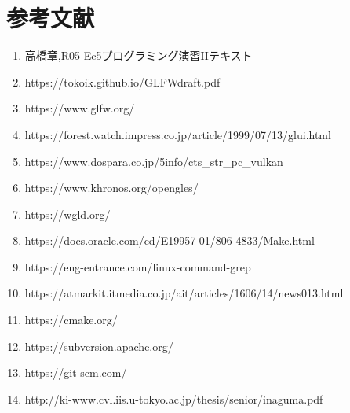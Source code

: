 \documentclass[]{jarticle}
\begin{document}
\section*{参考文献}
\begin{enumerate}
  \item 高橋章,R05-Ec5プログラミング演習I\hspace{-1.2pt}Iテキスト
  \item https://tokoik.github.io/GLFWdraft.pdf
  \item https://www.glfw.org/
  \item https://forest.watch.impress.co.jp/article/1999/07/13/glui.html
  \item https://www.dospara.co.jp/5info/cts\_str\_pc\_vulkan
  \item https://www.khronos.org/opengles/
  \item https://wgld.org/
  \item https://docs.oracle.com/cd/E19957-01/806-4833/Make.html
  \item https://eng-entrance.com/linux-command-grep
  \item https://atmarkit.itmedia.co.jp/ait/articles/1606/14/news013.html
  \item https://cmake.org/
  \item https://subversion.apache.org/
  \item https://git-scm.com/
  \item http://ki-www.cvl.iis.u-tokyo.ac.jp/thesis/senior/inaguma.pdf
\end{enumerate}
\end{document}
